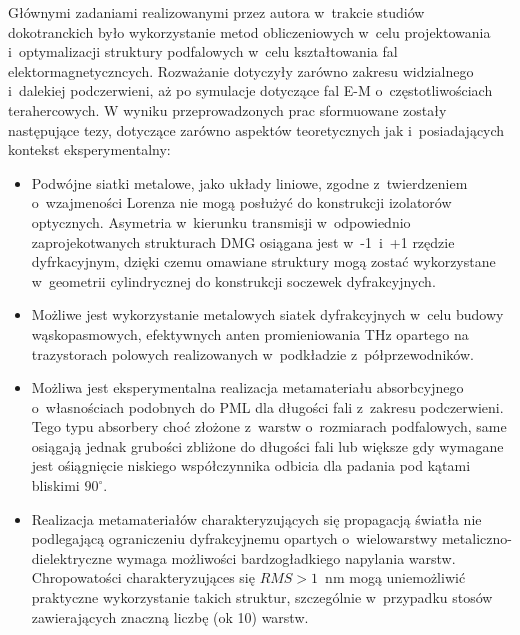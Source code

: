 Głównymi zadaniami realizowanymi przez autora w~trakcie studiów dokotranckich było wykorzystanie metod obliczeniowych w~celu projektowania i~optymalizacji struktury podfalowych w~celu kształtowania fal elektormagnetyczncych. Rozważanie dotyczyły zarówno zakresu widzialnego i~dalekiej podczerwieni, aż po symulacje dotyczące fal E-M o~częstotliwościach terahercowych. W wyniku przeprowadzonych prac sformuowane zostały następujące tezy, dotyczące zarówno aspektów teoretycznych jak i~posiadających kontekst eksperymentalny:
\begin{itemize}

\item Podwójne siatki metalowe, jako układy liniowe, zgodne z~twierdzeniem o~wzajmeności Lorenza nie mogą posłużyć do konstrukcji izolatorów optycznych. Asymetria w~kierunku transmisji w~odpowiednio zaprojekotwanych strukturach DMG osiągana jest w~-1~i~+1 rzędzie dyfrkacyjnym, dzięki czemu omawiane struktury mogą zostać wykorzystane w~geometrii cylindrycznej do konstrukcji soczewek dyfrakcyjnych.

\item Możliwe jest wykorzystanie metalowych siatek dyfrakcyjnych w~celu budowy wąskopasmowych, efektywnych anten promieniowania THz opartego na trazystorach polowych realizowanych w~podkładzie z~półprzewodników. 

\item Możliwa jest eksperymentalna realizacja metamateriału absorbcyjnego o~własnościach podobnych do PML dla długości fali z~zakresu podczerwieni. Tego typu absorbery choć złożone z~warstw o~rozmiarach podfalowych, same osiągają jednak grubości zbliżone do długości fali lub większe gdy wymagane jest ośiągnięcie niskiego współczynnika odbicia dla padania pod kątami bliskimi $90^{\circ}$.

\item Realizacja metamateriałów charakteryzujących się propagacją światła nie podlegającą ograniczeniu dyfrakcyjnemu opartych o~wielowarstwy metaliczno-dielektryczne wymaga możliwości bardzogładkiego napylania warstw. Chropowatości charakteryzująces się $RMS>1$~nm mogą uniemożliwić praktyczne wykorzystanie takich struktur, szczególnie w~przypadku stosów zawierających znaczną liczbę (ok 10) warstw.
\end{itemize}
